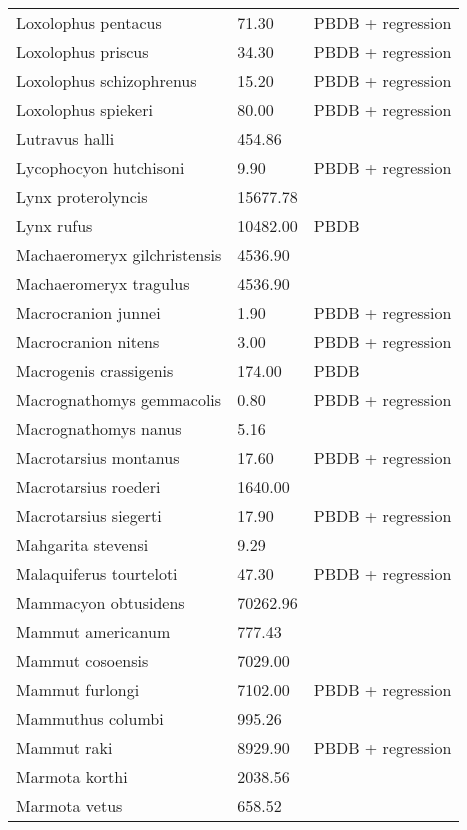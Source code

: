\documentclass{article}
\begin{document}
\begin{center}
\begin{longtable}{p{} p{} p{}}
    Loxolophus pentacus & 71.30 & PBDB + regression \\ 
    Loxolophus priscus & 34.30 & PBDB + regression \\ 
    Loxolophus schizophrenus & 15.20 & PBDB + regression \\ 
    Loxolophus spiekeri & 80.00 & PBDB + regression \\ 
    Lutravus halli & 454.86 & \cite{Tomiya2013} \\ 
    Lycophocyon hutchisoni & 9.90 & PBDB + regression \\ 
    Lynx proterolyncis & 15677.78 & \cite{Tomiya2013} \\ 
    Lynx rufus & 10482.00 & PBDB \\ 
    Machaeromeryx gilchristensis & 4536.90 & \cite{Tomiya2013} \\ 
    Machaeromeryx tragulus & 4536.90 & \cite{Tomiya2013} \\ 
    Macrocranion junnei & 1.90 & PBDB + regression \\ 
    Macrocranion nitens & 3.00 & PBDB + regression \\ 
    Macrogenis crassigenis & 174.00 & PBDB \\ 
    Macrognathomys gemmacolis & 0.80 & PBDB + regression \\ 
    Macrognathomys nanus & 5.16 & \cite{Tomiya2013} \\ 
    Macrotarsius montanus & 17.60 & PBDB + regression \\ 
    Macrotarsius roederi & 1640.00 & \cite{Soligo2006} \\ 
    Macrotarsius siegerti & 17.90 & PBDB + regression \\ 
    Mahgarita stevensi & 9.29 & \cite{Wortman1893} \\ 
    Malaquiferus tourteloti & 47.30 & PBDB + regression \\ 
    Mammacyon obtusidens & 70262.96 & \cite{Tomiya2013} \\ 
    Mammut americanum & 777.43 & \cite{Smith2004} \\ 
    Mammut cosoensis & 7029.00 & \cite{Secord2008a} \\ 
    Mammut furlongi & 7102.00 & PBDB + regression \\ 
    Mammuthus columbi & 995.26 & \cite{Smith2004} \\ 
    Mammut raki & 8929.90 & PBDB + regression \\ 
    Marmota korthi & 2038.56 & \cite{Tomiya2013} \\ 
    Marmota vetus & 658.52 & \cite{Tomiya2013} \\ 

\end{longtable}
\end{center}
\end{document}
